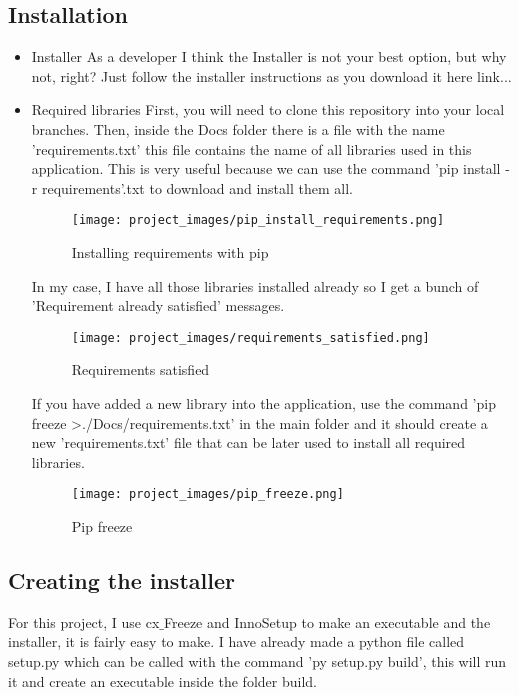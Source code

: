 \subsection{Installation}
\begin{itemize}
\item Installer
\newline As a developer I think the Installer is not your best option, but why not, right? Just follow the installer instructions as you download it here link...
\item Required libraries
\newline First, you will need to clone this repository into your local branches. Then, inside the Docs folder there is a file with the name 'requirements.txt' this file contains the name of all libraries used in this application. This is very useful because we can use the command 'pip install -r requirements'.txt to download and install them all.

\begin{figure}[H]
\centering
\texttt{[image: project\_images/pip\_install\_requirements.png]}
 \caption{Installing requirements with pip}
 \label{fig:pip install requirements}
\end{figure}

In my case, I have all those libraries installed already so I get a bunch of 'Requirement already satisfied' messages.

\begin{figure}[H]
\centering
\texttt{[image: project\_images/requirements\_satisfied.png]}
 \caption{Requirements satisfied}
 \label{fig:requirements satisfied}
\end{figure}

If you have added a new library into the application, use the command 'pip freeze \textgreater ./Docs/requirements.txt' in the main folder and it should create a new 'requirements.txt' file that can be later used to install all required libraries.

\begin{figure}[H]
\centering
\texttt{[image: project\_images/pip\_freeze.png]}
 \caption{Pip freeze}
 \label{fig:pip freeze}
\end{figure}	
\end{itemize}

\subsection{Creating the installer}
	For this project, I use cx$\_$Freeze and InnoSetup to make an executable and the installer, it is fairly easy to make. I have already made a python file called setup.py which can be called with the command 'py setup.py build', this will run it and create an executable inside the folder build.

